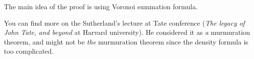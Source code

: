 The main idea of the proof is using Voronoi summation formula.

You can find more on the Sutherland's lecture \cite{sutherland} at Tate conference (\emph{The legacy of John Tate, and beyond} at Harvard university).
He considered it as \emph{a} murmuration theorem, and might not be \emph{the} murmuration theorem since the density formula is too complicated.